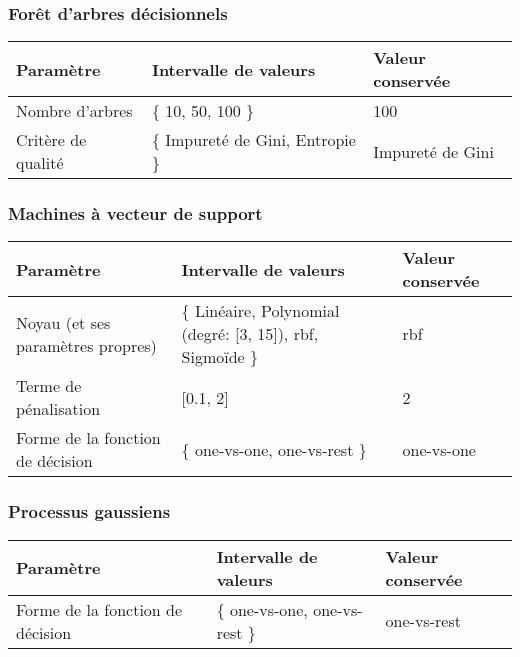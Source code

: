\subsubsection*{Forêt d'arbres décisionnels}

\noindent
\begin{tabularx}{\textwidth}{|X|X|X|}
    \hline
    \bf{Paramètre} & \bf{Intervalle de valeurs} & \bf{Valeur conservée}\\
    \hline
    Nombre d'arbres  & \{ 10, 50, 100 \} & 100\\\hline
    Critère de qualité & \{ Impureté de Gini, Entropie \} & Impureté de Gini\\\hline
\end{tabularx}

\subsubsection*{Machines à vecteur de support}

\noindent
\begin{tabularx}{\textwidth}{|X|X|X|}
    \hline
    \bf{Paramètre} & \bf{Intervalle de valeurs} & \bf{Valeur conservée}\\
    \hline
    Noyau (et ses paramètres propres)  & \{ Linéaire, Polynomial (degré: [3, 15]), rbf, Sigmoïde \} & rbf \\\hline
    Terme de pénalisation  & [0.1, 2] & 2\\\hline
    Forme de la fonction de décision  & \{ one-vs-one, one-vs-rest \} & one-vs-one \\\hline
\end{tabularx}

\subsubsection*{Processus gaussiens}

\noindent
\begin{tabularx}{\textwidth}{|X|X|X|}
    \hline
    \bf{Paramètre} & \bf{Intervalle de valeurs} & \bf{Valeur conservée}\\
    \hline
     Forme de la fonction de décision  & \{ one-vs-one, one-vs-rest \} & one-vs-rest \\\hline
\end{tabularx}
